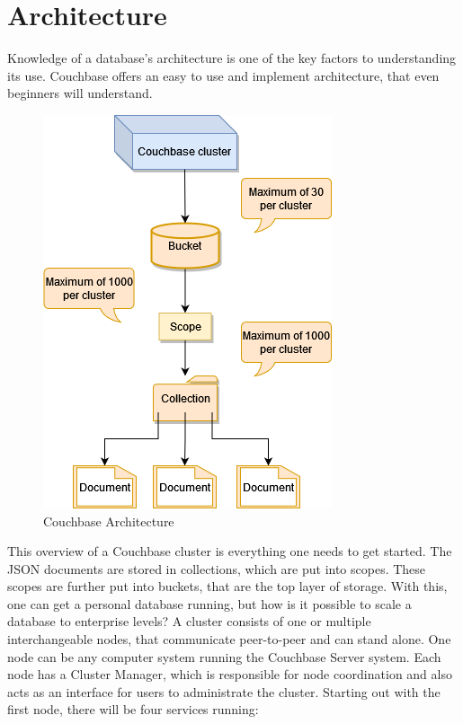 \section{Architecture}
Knowledge of a database's architecture is one of the key factors to understanding its use. Couchbase offers an easy to use and implement architecture, that even beginners will understand.
\begin{figure}[H]
    \centering
        \includegraphics[scale=0.8]{images/CouchbaseArchitecture.drawio.png}
    \caption{Couchbase Architecture \parencite{CouchbaseArchitecture}}
    \label{fig:CouchbaseArchitecture}
\end{figure}
This overview of a Couchbase cluster is everything one needs to get started. The \ac{JSON} documents are stored in collections, which are put into scopes. These scopes are further put into buckets, that are the top layer of storage. \parencite{CouchbaseIntroduction}\newline
With this, one can get a personal database running, but how is it possible to scale a database to enterprise levels? A cluster consists of one or multiple interchangeable nodes, that communicate peer-to-peer and can stand alone. One node can be any computer system running the Couchbase Server system. \parencite{CouchbasePaper}\newline Each node has a Cluster Manager, which is responsible for node coordination and also acts as an interface for users to administrate the cluster. Starting out with the first node, there will be four services running:
